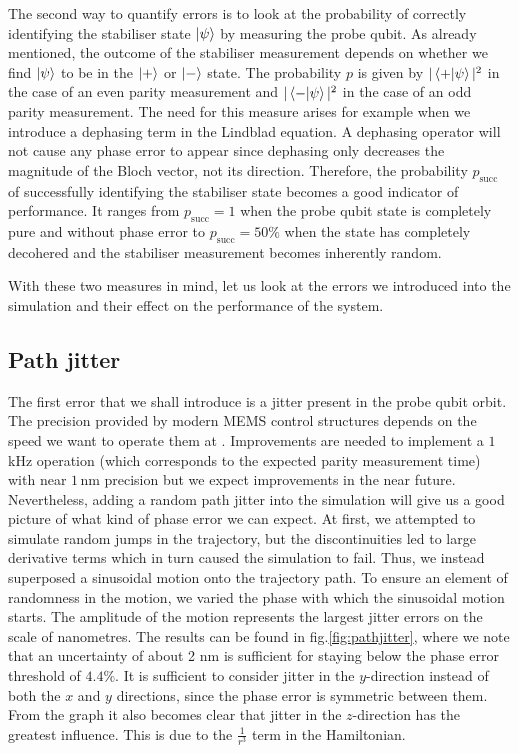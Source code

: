 The second way to quantify errors is to look at the probability of correctly identifying the stabiliser state  $\ket{\psi}$ by measuring the probe qubit. As already mentioned, the outcome of the stabiliser measurement depends on whether we find $\ket{\psi}$ to be in the $\ket{+}$ or $\ket{-}$ state. The probability $p$ is given by $|\left\langle +|\psi \right\rangle|^2$ in the case of an even parity measurement and $|\left\langle - |\psi \right\rangle|^2$ in the case of an odd parity measurement. The need for this measure arises for example when we introduce a dephasing term in the Lindblad equation. A dephasing operator will not cause any phase error to appear since dephasing only decreases the magnitude of the Bloch vector, not its direction. Therefore, the probability $p_{\mathrm{succ}}$ of successfully identifying the stabiliser state becomes a good indicator of performance. It ranges from $p_{\mathrm{succ}} = 1$ when the probe qubit state is completely pure and without phase error to $p_{\mathrm{succ}} = 50 \%$ when the state has completely decohered and the stabiliser measurement becomes inherently random. %

With these two measures in mind, let us look at the errors we introduced into the simulation and their effect on the performance of the system. 




\subsection{Path jitter}\label{sec:jitter}
The first error that we shall introduce is a jitter present in the probe qubit orbit. The precision provided by modern MEMS control structures depends on the speed we want to operate them at \cite{Chu2003,Koo2012}. Improvements are needed to implement a $1\, $kHz operation (which corresponds to the expected parity measurement time) with near $1\, $nm precision but we expect improvements in the near future. Nevertheless, adding a random path jitter into the simulation will give us a good picture of what kind of phase error we can expect. At first, we attempted to simulate random jumps in the trajectory, but the discontinuities led to large derivative terms which in turn caused the simulation to fail. Thus,  we instead superposed a sinusoidal motion onto the trajectory path. To ensure an element of randomness in the motion, we varied the phase with which the sinusoidal motion starts. The amplitude of the motion represents the largest jitter errors on the scale of nanometres. The results can be found in fig.\@ \ref{fig:pathjitter}, where we note that an uncertainty of about 2 nm is sufficient for staying below the phase error threshold of $4.4 \%$.  It is sufficient to consider jitter in the $y$-direction instead of both the $x$ and $y$ directions, since the phase error is symmetric between them. 
From the graph it also becomes clear that jitter in the $z$-direction has the greatest influence. This is due to the $\frac{1}{r^3}$  term in the Hamiltonian.



